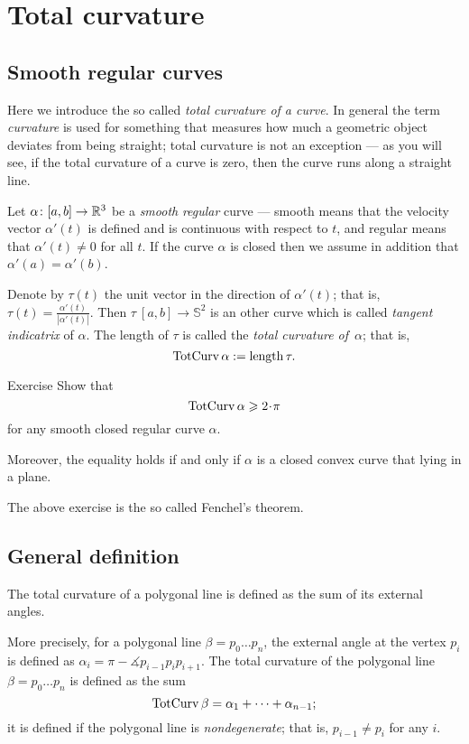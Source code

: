 \chapter{Total curvature}

\section{Smooth regular curves}\label{sec:total-curvature-smooth}

Here we introduce the so called \emph{total curvature of a curve}.
In general the term \emph{curvature} is used for something that measures how much 
a geometric object deviates from being straight;
total curvature is not an exception --- as you will see, if the total curvature of a curve is zero, then the curve runs along a straight line.


Let $\alpha\colon[a,b]\to\mathbb{R}^3$ be a \emph{smooth} \emph{regular} curve --- smooth means that
the velocity vector $\alpha'(t)$ is defined and is continuous with respect to $t$, and regular means that $\alpha'(t)\ne 0$ for all $t$.
If the curve $\alpha$ is closed then we assume in addition that $\alpha'(a)=\alpha'(b)$.

Denote by $\tau(t)$ the unit vector in the direction of $\alpha'(t)$;
that is, $\tau(t)=\tfrac{\alpha'(t)}{|\alpha'(t)|}$.
Then $\tau\:[a,b]\to\mathbb{S}^2$ is an other curve which is called \emph{tangent indicatrix} of $\alpha$.
The length of $\tau$ is called the \emph{total curvature of}~$\alpha$;
that is,
\[\mathop{\rm TotCurv}\nolimits\alpha:=\mathop{\rm length}\nolimits\tau.\]

\begin{thm}{Exercise}\label{ex:fenchel}
Show that 
\[\tc\alpha\ge 2\cdot \pi\]
for any smooth closed regular curve $\alpha$.

Moreover, the equality holds if and only if $\alpha$ is a closed convex curve that lying in a plane.
\end{thm}

The above exercise is the so called Fenchel's theorem.


\section{General definition}

The total curvature of a polygonal line is defined as the sum of its external angles.

More precisely, 
for a polygonal line $\beta=p_0\dots p_n$,
the external angle at the vertex $p_i$ is defined as $\alpha_i=\pi-\measuredangle p_{i-1}p_ip_{i+1}$.
The total curvature of the polygonal line $\beta=p_0\dots p_n$ is defined as the sum
\[\mathop{\rm TotCurv}\nolimits\beta=\alpha_1+\dots+\alpha_{n-1};\]
it is defined if the polygonal line is \emph{nondegenerate}; that is, $p_{i-1}\ne p_i$ for any $i$.

